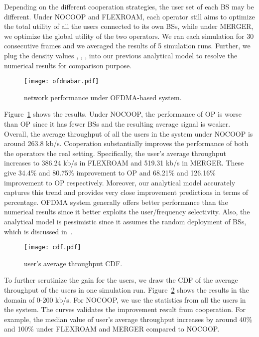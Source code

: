 \documentclass[conference]{IEEEtran}
\begin{document}
Depending on the different cooperation strategies, the user set of each BS may be different. Under NOCOOP and FLEXROAM, each operator still aims to optimize the total utility of all the users connected to its own BSs, while under MERGER, we optimize the global utility of the two operators. We ran each simulation for 30 consecutive frames and we averaged the results of 5 simulation runs. Further, we plug the density values , , ,  into our previous analytical model to resolve the numerical results for comparison purpose.

\begin{figure}[htbp]
    \centerline{\texttt{[image: ofdmabar.pdf]}}
    \caption{
       network performance under OFDMA-based system.
    }
    \label{fig:ofdmabar}
    \vspace{-0.1in}
\end{figure}
Figure~\ref{fig:ofdmabar} shows the results. Under NOCOOP, the performance of OP is worse than OP since it has fewer BSs and the resulting average signal is weaker. Overall, the average throughput of all the users in the system under NOCOOP is around 263.8 kb/s. Cooperation substantially improves the performance of both the operators the real setting. Specifically, the user's average throughput increases to 386.24 kb/s in FLEXROAM and 519.31 kb/s in MERGER. These give 34.4\% and 80.75\% improvement to OP and 68.21\% and 126.16\% improvement to OP respectively. Moreover, our analytical model accurately captures this trend and provides very close improvement predictions in terms of percentage. OFDMA system generally offers better performance than the numerical results since it better exploits the user/frequency selectivity. Also, the analytical model is pessimistic since it assumes the random deployment of BSs, which is discussed in~\cite{Jeffrey@TCOM10}.

\begin{figure}[htbp]
    \centerline{\texttt{[image: cdf.pdf]}}
    \caption{
       user's average throughput CDF.
    }
    \label{fig:cdf}
    \vspace{-0.2in}
\end{figure}
To further scrutinize the gain for the users, we draw the CDF of the average throughput of the users in one simulation run. Figure~\ref{fig:cdf} shows the results in the domain of 0-200 kb/s. For NOCOOP, we use the statistics from all the users in the system. The  curves validates the improvement result from cooperation. For example, the median value of user's average throughput increases by around 40\% and 100\% under FLEXROAM and MERGER compared to NOCOOP.
\end{document}
